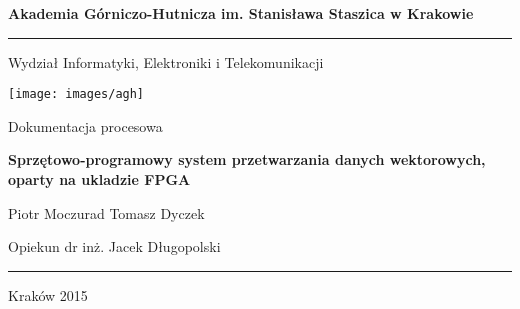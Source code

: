 \begin{titlepage}
    \begin{center}

        \textbf{Akademia Górniczo-Hutnicza im. Stanisława Staszica w Krakowie}
        \rule{\textwidth}{1pt}\par
        \vspace{0.5cm}
        Wydział Informatyki, Elektroniki i Telekomunikacji
        
        \vspace{1.5cm}

        \texttt{[image: images/agh]}
 		
 		\vspace{1.5cm}
 		
 		Dokumentacja procesowa
 		
 		\vspace{0.5cm}
	 	\textbf{Sprzętowo-programowy system przetwarzania danych wektorowych, oparty na ukladzie FPGA}
		
		Piotr Moczurad
		Tomasz Dyczek
		
		Opiekun
		dr inż. Jacek Długopolski
		\rule{\textwidth}{1pt}\par
		Kraków 2015
		
        
    \end{center}
\end{titlepage}